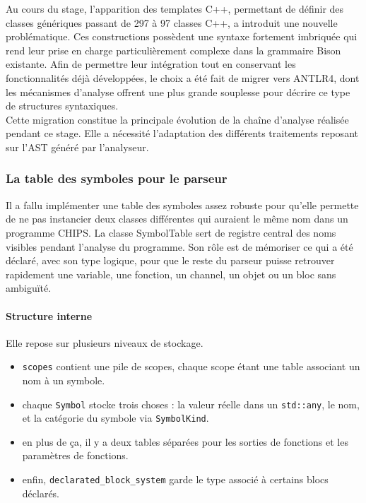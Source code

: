 Au cours du stage, l'apparition des templates C++, permettant de définir des classes génériques passant de 297 à 97 classes C++, a introduit une nouvelle problématique. Ces constructions possèdent une syntaxe fortement imbriquée qui rend leur prise en charge particulièrement complexe dans la grammaire Bison existante. Afin de permettre leur intégration tout en conservant les fonctionnalités déjà développées, le choix a été fait de migrer vers ANTLR4, dont les mécanismes d'analyse offrent une plus grande souplesse pour décrire ce type de structures syntaxiques. \\

Cette migration constitue la principale évolution de la chaîne d'analyse réalisée pendant ce stage. Elle a nécessité l'adaptation des différents traitements reposant sur l'AST généré par l'analyseur. \\

\subsubsection{La table des symboles pour le parseur}
\label{sec:table_symbole_parseur}

Il a fallu implémenter une table des symboles assez robuste pour qu'elle permette de ne pas instancier deux classes différentes qui auraient le même nom dans un programme CHIPS. La classe SymbolTable sert de registre central des noms visibles pendant l'analyse du programme. Son rôle est de mémoriser ce qui a été déclaré, avec son type logique, pour que le reste du parseur puisse retrouver rapidement une variable, une fonction, un channel, un objet ou un bloc sans ambiguïté. \\

\paragraph{Structure interne}

Elle repose sur plusieurs niveaux de stockage.
\begin{itemize}[label=$\bullet$]
    \item \texttt{scopes} contient une pile de scopes, chaque scope étant une table associant un nom à un symbole.
    \item chaque \texttt{Symbol} stocke trois choses : la valeur réelle dans un \texttt{std::any}, le nom, et la catégorie du symbole via \texttt{SymbolKind}.
    \item en plus de ça, il y a deux tables séparées pour les sorties de fonctions et les paramètres de fonctions.
    \item enfin, \texttt{declarated\_block\_system} garde le type associé à certains blocs déclarés.
\end{itemize}

